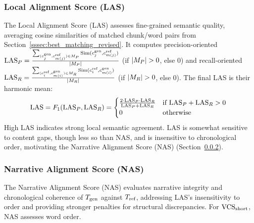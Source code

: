 \subsubsection{Local Alignment Score (LAS)} %
\label{ssec:las_revised} %
The Local Alignment Score (LAS) assesses fine-grained semantic quality, averaging cosine similarities of matched chunk/word pairs from Section~\ref{sssec:best_matching_revised}. It computes precision-oriented $\text{LAS}_P = \frac{\sum_{(c_{j}^{\text{gen}},c_{m(j)}^{\text{ref}})\in M_P}\text{Sim}(c_{j}^{\text{gen}},c_{m(j)}^{\text{ref}})}{|M_P|}$ (if $|\MP|>0$, else 0) and recall-oriented $\text{LAS}_R = \frac{\sum_{(c_{i}^{\text{ref}},c_{m(i)}^{\text{gen}})\in M_R}\text{Sim}(c_{i}^{\text{ref}},c_{m(i)}^{\text{gen}})}{|M_R|}$ (if $|\MR|>0$, else 0). The final LAS is their harmonic mean:
\begin{equation} \label{eq:las_revised}
\text{LAS} = F_1(\text{LAS}_P, \text{LAS}_R) =
\begin{cases}
\frac{2 \cdot \text{LAS}_P \cdot \text{LAS}_R}{\text{LAS}_P + \text{LAS}_R} & \text{if } \text{LAS}_P + \text{LAS}_R > 0 \\
0 & \text{otherwise}
\end{cases}
\end{equation}
High LAS indicates strong local semantic agreement. LAS is somewhat sensitive to content gaps, though less so than NAS, and is insensitive to chronological order, motivating the Narrative Alignment Score (NAS) (Section~\ref{ssec:nas_revised}).

\subsubsection{Narrative Alignment Score (NAS)} %
\label{ssec:nas_revised} %
The Narrative Alignment Score (NAS) evaluates narrative integrity and chronological coherence of $T_{\text{gen}}$ against $T_{\text{ref}}$, addressing LAS's insensitivity to order and providing stronger penalties for structural discrepancies. For $\text{VCS}_{\text{short}}$, NAS assesses word order.

